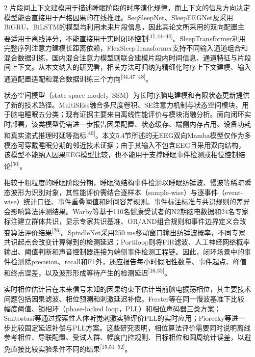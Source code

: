 \documentclass[UTF8,zihao=5,fontset=none]{ctexart}
\newcommand{\song}{\CJKfamily{song}}
\newcommand{\levelthree}[1]{%
  \par\noindent{\song\fontsize{10.5pt}{15.6pt}\selectfont #1}}
\newcommand{\refcite}[1]{\nolinebreak[4]\textsuperscript{[#1]}}
\begin{document}
\begin{multicols}{2}
片段间上下文建模用于描述睡眠阶段的时序演化规律，而上下文的信息方向决定模型能否直接用于严格因果的在线推理。SeqSleepNet、SleepEEGNet及采用BiGRU、BiLSTM的模型均利用未来片段信息，因此其论文所采用的双向配置主要适用于离线评分，不能直接用于实时闭环控制\refcite{41,44--46}。SleepTransformer利用完整序列注意力建模长距离依赖，FlexSleepTransformer支持不同输入通道组合和混合数据训练，国内混合注意力模型则联合建模片段内时间信息、通道特征与片段间上下文。从本文纳入的研究看，相关方法可归纳为精细化时序上下文建模、输入通道配置适配和混合数据训练三个方向\refcite{34,47--48}。\par

状态空间模型（state space model，SSM）为长时序脑电建模和有限状态更新提供了新的技术路径。MultiSEss融合多尺度卷积、SE注意力机制与状态空间模块，用于脑电睡眠五分类；现有证据主要来自离线性能评价与模块消融分析。面向闭环实时部署，该类模型仍需进一步报告因果配置、状态缓存、端侧内存占用、设备功耗和真实流式推理时延等指标\refcite{49}。本文5.4节所述的无EEG双向Mamba模型仅作为多模态可穿戴睡眠分期的邻近技术证据；由于其输入不包含EEG且采用双向结构，该模型不能纳入因果EEG模型比较，也不能用于支撑睡眠事件检测或相位控制结论\refcite{50}。\par

\levelthree{2.2.4 事件检测与相位预测算法}
相较于粗粒度的睡眠阶段分期，睡眠微结构事件检测以睡眠纺锤波、慢波等稀疏瞬态波形为识别对象，其性能评价需结合逐样本（sample-wise）与逐事件（event-wise）统计口径、事件重叠阈值和时间容差规则。事件标注标准与共识规则的差异会影响算法评测结果。Warby等基于110名健康受试者的N2期脑电数据和24名专家标注建立群体共识，显示专家共识基准、OR/AND组合规则和事件边界定义会改变算法评价结果\refcite{26}。SpindleNet采用250 ms移动窗口输出纺锤波概率，不同专家共识起点会改变计算得到的检测延迟；Portiloop则将FIR滤波、人工神经网络概率输出、阈值判断和声音控制器连接为端侧事件检测工程链。因此，闭环场景中的事件检测除precision、recall和F1外，还应报告每小时假阳性数量、事件起点、峰值和终点误差，以及波形形成等待产生的检测延迟\refcite{16,33}。\par

实时相位估计旨在未来信号未知的因果约束下估计当前脑电振荡相位，其主要技术问题包括因果滤波、相位预测和刺激延迟补偿。Ferster等在同一慢波基准下比较幅度阈值、锁相环（phase-locked loop，PLL）和相位声码器三类方案；Santostasi等通过探索性人体听觉刺激实验评价PLL的实时应用；Piorecky等进一步比较固定延迟补偿与PLL方案。这些研究表明，相位算法评价需要同时说明离线参考相位、导联配置、受试人群、幅度门控规则、目标相位和圆周统计误差，以避免直接比较实验条件不同的结果\refcite{15,51--52}。\par


\end{multicols}
\end{document}
